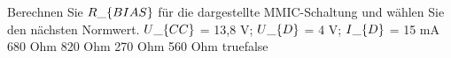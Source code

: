     {Berechnen Sie $R\_\text\{BIAS\}$ für die dargestellte MMIC-Schaltung und wählen Sie den nächsten Normwert. $U\_\text\{CC\}$ = 13,8 V; $U\_\text\{D\}$ = 4 V; $I\_\text\{D\}$ = 15 mA}
    {680 Ohm}
    {820 Ohm}
    {270 Ohm}
    {560 Ohm}
    {true}{false}